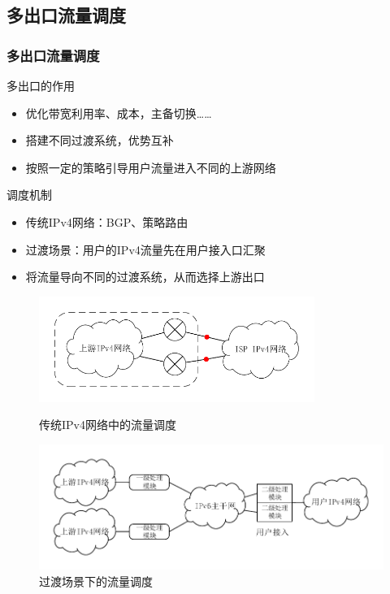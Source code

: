 \documentclass{beamer}
\begin{document}
\subsection{多出口流量调度}
\begin{frame}
  \frametitle{多出口流量调度}

  \begin{block}{多出口的作用}
    \begin{itemize}
    \item 优化带宽利用率、成本，主备切换……
    \item 搭建不同过渡系统，优势互补
    \item 按照一定的策略引导用户流量进入不同的上游网络
    \end{itemize}
  \end{block}

  \begin{block}{调度机制}
    \begin{itemize}
    \item 传统IPv4网络：BGP、策略路由
    \item 过渡场景：用户的IPv4流量先在用户接入口汇聚
    \item 将流量导向不同的过渡系统，从而选择上游出口
    \end{itemize}
  \end{block}
\end{frame}

\begin{frame}
  \begin{figure}
    \vspace{-1em}
    \includegraphics[width=0.8\textwidth]{figs/20-ipv4-multi-egress.pdf}
    \vspace{-2em}
    \caption{\tiny 传统IPv4网络中的流量调度}
    \vspace{-1em}
    \includegraphics[width=\textwidth]{figs/9-multi-egress.pdf}
    \vspace{-2em}
    \caption{\tiny 过渡场景下的流量调度}
  \end{figure}
\end{frame}
\end{document}
